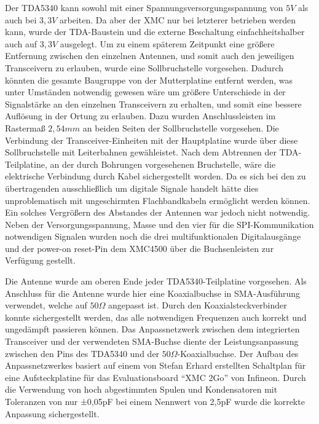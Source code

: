 Der TDA5340 kann sowohl mit einer Spannungsversorgungsspannung von $5V$ als auch bei $3,3V$ arbeiten. Da aber der XMC nur bei letzterer betrieben werden kann, wurde der TDA-Baustein und die externe Beschaltung einfachheitshalber auch auf  $3,3V$ ausgelegt. 
Um zu einem späterem Zeitpunkt eine größere Entfernung zwischen den einzelnen Antennen, und somit auch den jeweiligen Transceivern zu erlauben, wurde eine Sollbruchstelle vorgesehen. Dadurch könnten die gesamte Baugruppe von der Mutterplatine entfernt werden, was unter Umständen notwendig gewesen wäre um größere Unterschiede in der Signalstärke an den einzelnen Transceivern zu erhalten, und somit eine bessere Auflösung in der Ortung zu erlauben. Dazu wurden Anschlussleisten im Rastermaß $2,54mm$ an beiden Seiten der Sollbruchstelle vorgesehen. Die Verbindung der Transceiver-Einheiten mit der Hauptplatine wurde über diese Sollbruchstelle mit Leiterbahnen gewähleistet. Nach dem Abtrennen der TDA-Teilplatine, an der durch Bohrungen vorgesehenen Bruchstelle, wäre die elektrische Verbindung durch Kabel sichergestellt worden. Da es sich bei den zu übertragenden ausschließlich um digitale Signale handelt hätte dies unproblematisch mit ungeschirmten Flachbandkabeln ermöglicht werden können. Ein solches Vergrößern des Abstandes der Antennen war jedoch nicht notwendig. Neben der Versorgungsspannung, Masse und den vier für die \ac{SPI}-Kommunikation notwendigen Signalen wurden noch die drei multifunktionalen Digitalausgänge und der power-on reset-Pin dem XMC4500 über die Buchsenleisten zur Verfügung gestellt.


 
Die Antenne wurde am oberen Ende jeder TDA5340-Teilplatine vorgesehen. Als Anschluss für die Antenne wurde hier eine Koaxialbuchse in \ac{SMA}-Ausführung verwendet, welche auf $50\Omega$ angepasst ist. Durch den Koaxialsteckverbinder konnte sichergestellt werden, das alle notwendigen Frequenzen auch korrekt und ungedämpft passieren können. 
Das Anpassnetzwerk zwischen dem  integrierten Transceiver und der verwendeten SMA-Buchse diente der Leistungsanpassung zwischen den Pins des TDA5340 und der $50\Omega$-Koaxialbuchse. Der Aufbau des Anpassnetzwerkes basiert auf einem von Stefan Erhard erstellten Schaltplan für eine Aufsteckplatine für das Evaluationsboard \enquote{XMC 2Go} von Infineon. Durch die Verwendung von hoch abgestimmten Spulen und Kondensatoren mit Toleranzen von nur ±0,05pF bei einem Nennwert von 2,5pF wurde die korrekte Anpassung sichergestellt. 
 
